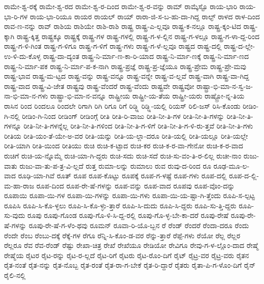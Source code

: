 {ರಾಮೇ-ಶ್ವ-ರಕ್ಕೆ
ರಾಮೇ-ಶ್ವ-ರದ
ರಾಮೇ-ಶ್ವ-ರ-ದಿಂದ
ರಾಮೇ-ಶ್ವ-ರ-ವನ್ನು
ರಾಮ್
ರಾಮ್ಕೆಸ್ಟೊ
ರಾಯ-ಭಾರಿ
ರಾಯ-ಭಾ-ರಿ-ಗಳ
ರಾಯ-ಭಾ-ರಿಯೂ
ರಾಯರ
ರಾಯಲ್
ರಾಯ್
ರಾರಾ-ಜಿ-ಸ-ಬ-ಹು-ದಾ-ಗಿದ್ದ
ರಾಲ್ಫ್
ರಾಳದ
ರಾಳ-ದಿಂದ
ರಾವ-ಣ-ನನ್ನು
ರಾವ್
ರಾಶಿಯ
ರಾಶಿಯೇ
ರಾಶಿ-ರಾಶಿ
ರಾಷ್ಟ್ರ
ರಾಷ್ಟ್ರ-ಎ-ಲ್ಲವೂ
ರಾಷ್ಟ್ರ-ಕ-ನಲ್ಲೂ
ರಾಷ್ಟ್ರ-ಕ್ಕಂ-ಟಿದ
ರಾಷ್ಟ್ರ-ಕ್ಕಾಗಿ
ರಾಷ್ಟ್ರ-ಕ್ಕಿತ್ತ
ರಾಷ್ಟ್ರಕ್ಕೂ
ರಾಷ್ಟ್ರಕ್ಕೆ
ರಾಷ್ಟ್ರ-ಗಳ
ರಾಷ್ಟ್ರ-ಗಳಲ್ಲಿ
ರಾಷ್ಟ್ರ-ಗ-ಳ-ಲ್ಲಿನ
ರಾಷ್ಟ್ರ-ಗ-ಳಲ್ಲೂ
ರಾಷ್ಟ್ರ-ಗ-ಳಾ-ದ್ದ-ರಿಂದ
ರಾಷ್ಟ್ರ-ಗ-ಳಿ-ಗಿಂತ
ರಾಷ್ಟ್ರ-ಗ-ಳಿಗೂ
ರಾಷ್ಟ್ರ-ಗ-ಳಿಗೆ
ರಾಷ್ಟ್ರ-ಗಳು
ರಾಷ್ಟ್ರ-ಗ-ಳೆ-ಲ್ಲವೂ
ರಾಷ್ಟ್ರದ
ರಾಷ್ಟ್ರ-ದಲ್ಲಿ
ರಾಷ್ಟ್ರ-ದ-ಲ್ಲೇ-ಉ-ಳಿ-ದು-ಕೊಳ್ಳ
ರಾಷ್ಟ್ರ-ದಾ-ದ್ಯಂತ
ರಾಷ್ಟ್ರ-ನಿ-ರ್ಮಾ-ಣ-ಕಾ-ರಿ-ಯಾದ
ರಾಷ್ಟ್ರ-ನಿ-ರ್ಮಾ-ಣಕ್ಕೆ
ರಾಷ್ಟ್ರ-ನಿ-ರ್ಮಾ-ಣದ
ರಾಷ್ಟ್ರ-ನಿ-ರ್ಮಾ-ಪಕ
ರಾಷ್ಟ್ರ-ನಿ-ರ್ಮಾ-ಪ-ಕ-ನಾಗಿ
ರಾಷ್ಟ್ರ-ಪ್ರಜ್ಞೆ
ರಾಷ್ಟ್ರ-ಪ್ರ-ಜ್ಞೆಯೂ
ರಾಷ್ಟ್ರ-ಪ್ರೇಮ
ರಾಷ್ಟ್ರ-ಪ್ರೇ-ಮವು
ರಾಷ್ಟ್ರ-ಭಾವ
ರಾಷ್ಟ್ರ-ಮ-ಟ್ಟದ
ರಾಷ್ಟ್ರ-ವನ್ನು
ರಾಷ್ಟ್ರ-ವನ್ನೂ
ರಾಷ್ಟ್ರ-ವನ್ನೇ
ರಾಷ್ಟ್ರ-ವ-ಲ್ಲವೆ
ರಾಷ್ಟ್ರ-ವಾಗಿ
ರಾಷ್ಟ್ರ-ವಾ-ಗಿದ್ದ
ರಾಷ್ಟ್ರ-ವಾದ
ರಾಷ್ಟ್ರ-ವಿ-ಜೇತ
ರಾಷ್ಟ್ರವು
ರಾಷ್ಟ್ರ-ವೆಂದರೆ
ರಾಷ್ಟ್ರ-ವೆಂದು
ರಾಷ್ಟ್ರವೇ
ರಾಷ್ಟ್ರವೋ
ರಾಷ್ಟ್ರಾ-ಭಿ-ಮಾ-ನ-ಸ್ವ-ಜ-ನಾ-ಭಿ-ಮಾ-ನ-ಗಳು
ರಾಷ್ಟ್ರಾ-ಭಿ-ಮಾ-ನ-ವನ್ನೂ
ರಾಷ್ಟ್ರೀಯ
ರಾಷ್ಟ್ರೀ-ಯ-ತೆಯ
ರಾಷ್ಟ್ರೀ-ಯರು
ರಾಷ್ಟ್ರೋ-ನ್ನ-ತಿಯ
ರಾಸಿನ
ರಿಂದ
ರಿಂದಲೂ
ರಿಂದಲೇ
ರಿಗಾಗಿ
ರಿಗಿ
ರಿಗೂ
ರಿಗೆ
ರಿಡ್ಜ್ಲಿ
ರಿಡ್ಜ್ಲಿ-ಯಲ್ಲಿ
ರಿಯಸ್
ರಿಲಿ-ಜಸ್
ರಿಸಿ-ಕೊಂಡು
ರೀಡಿಂ-ಗಿ-ನಲ್ಲಿ
ರೀಡಿಂ-ಗಿ-ನಿಂದ
ರೀಡಿಂಗ್
ರೀಡಿಂಗ್ಗೆ
ರೀತಿ
ರೀತಿ-ರಿ-ವಾಜು
ರೀತಿ-ನೀ-ತಿ-ಗಳ
ರೀತಿ-ನೀ-ತಿ-ಗಳನ್ನು
ರೀತಿ-ನೀ-ತಿ-ಗಳನ್ನೂ
ರೀತಿ-ನೀ-ತಿ-ಗಳನ್ನೆಲ್ಲ
ರೀತಿ-ನೀ-ತಿ-ಗಳಿಂದ
ರೀತಿ-ನೀ-ತಿ-ಗ-ಳಿಗೆ
ರೀತಿ-ನೀ-ತಿ-ಗ-ಳಿ-ರು-ತ್ತವೆ
ರೀತಿ-ನೀ-ತಿ-ಗಳು
ರೀತಿಯ
ರೀತಿ-ಯಂ-ತೆ-ಯೇ-ಅ-ವರ
ರೀತಿ-ಯನ್ನು
ರೀತಿ-ಯ-ಲ್ಲಾ-ದರೂ
ರೀತಿ-ಯಲ್ಲಿ
ರೀತಿ-ಯಲ್ಲೂ
ರೀತಿ-ಯಲ್ಲೇ
ರೀತಿ-ಯಾಗಿ
ರೀತಿ-ಯಿಂದ
ರೀತಿಯು
ರುಚಿ
ರುಚಿ-ಕ-ಟ್ಟಾದ
ರುಚಿ-ಕರ
ರುಚಿ-ಕ-ರ-ವಾ-ಗೇನೋ
ರುಚಿ-ಕ-ರ-ವಾದ
ರುಚಿಗೆ
ರುಚಿ-ಯ-ನ್ನೊಮ್ಮೆ
ರುಚಿ-ಯಾ-ಗಿ-ದ್ದರು
ರುಚಿ-ಸದು
ರುಚಿ-ಸದೆ
ರುಚಿ-ಸು-ವಂ-ತಿ-ರ-ಲಿಲ್ಲ
ರುಚೀ-ನಾಂ
ರುಜು-ವಾತು
ರುಜು-ವಾ-ತು-ಪ-ತ್ರ-ವಿ-ಲ್ಲದೆ
ರುತ್ತ
ರುಮಾ-ಲನ್ನು
ರುಮಾಲು
ರುವ
ರುವು-ದ-ರಿಂದ
ರೂ
ರೂಢ-ಮೂ-ಲ-ವಾದ
ರೂಢಿ-ಯಾ-ಗಿವೆ
ರೂತ್
ರೂಪ
ರೂಪ-ಕೊಟ್ಟು
ರೂಪಕ್ಕೆ
ರೂಪ-ಗ-ಳಷ್ಟೆ
ರೂಪ-ಗಳು
ರೂಪ-ದಲ್ಲಿ
ರೂಪ-ದ-ಲ್ಲಿ-ಮ-ಹಾ-ರಾಜ
ರೂಪ-ದಿಂದ
ರೂಪ-ರೇ-ಷೆ-ಗಳನ್ನು
ರೂಪ-ವನ್ನು
ರೂಪ-ವಾದ
ರೂಪವು
ರೂಪ-ವೊಂ-ದನ್ನು
ರೂಪಾಯಿ
ರೂಪಾ-ಯಿ-ಗಳ
ರೂಪಾ-ಯಿ-ಗಳನ್ನು
ರೂಪಾ-ಯಿ-ಗಳು
ರೂಪಾ-ಯಿ-ಯ-ಷ್ಟಾ-ಗಿ-ತ್ತೆಂದು
ರೂಪಿ-ಸ-ಲ್ಪಟ್ಟ
ರೂಪಿಸಿ
ರೂಪಿ-ಸಿ-ಕೊ-ಳ್ಳಲು
ರೂಪಿ-ಸಿ-ಕೊ-ಳ್ಳು-ತ್ತಾರೆ
ರೂಪಿ-ಸಿ-ದುದು
ರೂಪಿ-ಸಿ-ದ್ದರು
ರೂಪಿ-ಸು-ತ್ತಿ-ದ್ದರು
ರೂಪಿ-ಸು-ವುದು
ರೂಪು
ರೂಪು-ಗೊಂಡ
ರೂಪು-ಗೊ-ಳಿ-ಸಿ-ದ್ದ-ರಲ್ಲಿ
ರೂಪು-ಗೊ-ಳ್ಳ-ಬೇ-ಕಾ-ದರೆ
ರೂಪು-ರೇಷೆ
ರೂಪು-ರೇ-ಷೆ-ಗಳನ್ನು
ರೂಪು-ರೇ-ಷೆ-ಗ-ಳೆಂ-ಥವು
ರೂಮನ್
ರೂವಾ-ರಿ-ಯೊ-ಬ್ಬನ
ರೆ
ರೆಂಡ್
ರೆಂದರೆ
ರೆಂದಾ-ದರೂ
ರೆಂದು
ರೆಂದೇ
ರೆಂಬ
ರೆಂಬು-ದಕ್ಕೆ
ರೆಕ್ಕೆ-ಗಳ
ರೆಗೂ
ರೆನ್ನಿ-ಸಿ-ಕೊಂ-ಡ-ವರ
ರೆನ್ನು-ತ್ತಾರೆ
ರೆಪ್ಪೆ-ಗಳು
ರೆಯೋ
ರೆಲ್ಲ
ರೆಲ್ಲರ
ರೆಲ್ಲರೂ
ರೆವ
ರೆವ-ರೆಂಡ್
ರೆಷ್ಟು
ರೇಖಾ-ಚಿತ್ರ
ರೇಖೆ
ರೇಖೆಯೂ
ರೇಡಿಯೋ
ರೇವಿಗೂ
ರೇವು-ಗ-ಳ-ಲ್ಲೊಂ-ದಾದ
ರೇಷ್ಮೆ
ರೇಷ್ಮೆಯ
ರೈಟರ
ರೈಟ-ರನ್ನು
ರೈಟ-ರ-ಲ್ಲದೆ
ರೈಟ-ರಿಗೆ
ರೈಟರು
ರೈಟ-ರೊಂ-ದಿಗೆ
ರೈಟ್
ರೈಟ್ರ-ವರ
ರೈಟ್ರ-ವರು
ರೈತನ
ರೈತ-ನಂತೆ
ರೈತ-ನನ್ನು
ರೈತ-ನೊಬ್ಬ
ರೈತ-ರಂತೆ
ರೈತ-ರಾ-ಗ-ಬೇಕೆ
ರೈತ-ರಿ-ದ್ದಾರೆ
ರೈತರು
ರೈತಾ-ಪಿ-ಗ-ಳೊಂ-ದಿಗೆ
ರೈನ್
ರೈಲಿ-ನಲ್ಲಿ
}

